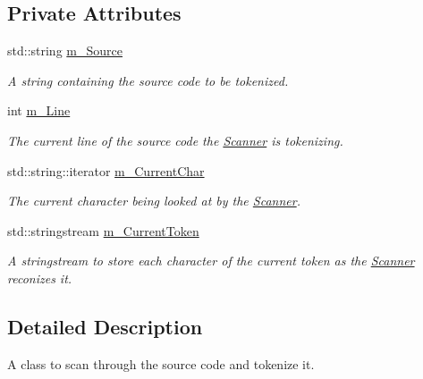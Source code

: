 \subsection*{Private Attributes}
\begin{DoxyCompactItemize}
\item 
\mbox{\label{class_scanner_a7bc86a6224b3f5ed70d31ba97e6dde23}} 
std\+::string \hyperlink{class_scanner_a7bc86a6224b3f5ed70d31ba97e6dde23}{m\+\_\+\+Source}
\begin{DoxyCompactList}\small\item\em A string containing the source code to be tokenized. \end{DoxyCompactList}\item 
\mbox{\label{class_scanner_af1ca96d967cc65e78c471962d1822a62}} 
int \hyperlink{class_scanner_af1ca96d967cc65e78c471962d1822a62}{m\+\_\+\+Line}
\begin{DoxyCompactList}\small\item\em The current line of the source code the \hyperlink{class_scanner}{Scanner} is tokenizing. \end{DoxyCompactList}\item 
\mbox{\label{class_scanner_a472f832eb3fe8f7eb790cd515132566c}} 
std\+::string\+::iterator \hyperlink{class_scanner_a472f832eb3fe8f7eb790cd515132566c}{m\+\_\+\+Current\+Char}
\begin{DoxyCompactList}\small\item\em The current character being looked at by the \hyperlink{class_scanner}{Scanner}. \end{DoxyCompactList}\item 
\mbox{\label{class_scanner_aa8166924571e1ababf368a6bde00f406}} 
std\+::stringstream \hyperlink{class_scanner_aa8166924571e1ababf368a6bde00f406}{m\+\_\+\+Current\+Token}
\begin{DoxyCompactList}\small\item\em A stringstream to store each character of the current token as the \hyperlink{class_scanner}{Scanner} reconizes it. \end{DoxyCompactList}\end{DoxyCompactItemize}


\subsection{Detailed Description}
A class to scan through the source code and tokenize it. 

